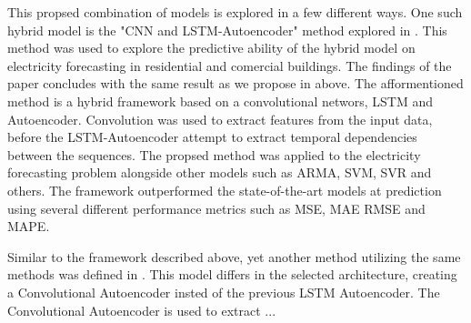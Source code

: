 This propsed combination of models is explored in a few different ways.
One such hybrid model is the "CNN and LSTM-Autoencoder" method explored in \cite{Khan2020}.
This method was used to explore the predictive ability of the hybrid model on electricity forecasting in residential and comercial buildings.
The findings of the paper concludes with the same result as we propose in above.
The afformentioned method is a hybrid framework based on a convolutional networs, LSTM and Autoencoder.
Convolution was used to extract features from the input data, before the LSTM-Autoencoder attempt to extract temporal dependencies between the sequences.
The propsed method was applied to the electricity forecasting problem alongside other models such as ARMA, SVM, SVR and others.
The framework outperformed the state-of-the-art models at prediction using several different performance metrics such as MSE, MAE RMSE and MAPE.


Similar to the framework described above, yet another method utilizing the same methods was defined in \cite{Khan2020}.
This model differs in the selected architecture, creating a Convolutional Autoencoder insted of the previous LSTM Autoencoder.
The Convolutional Autoencoder is used to extract ...












